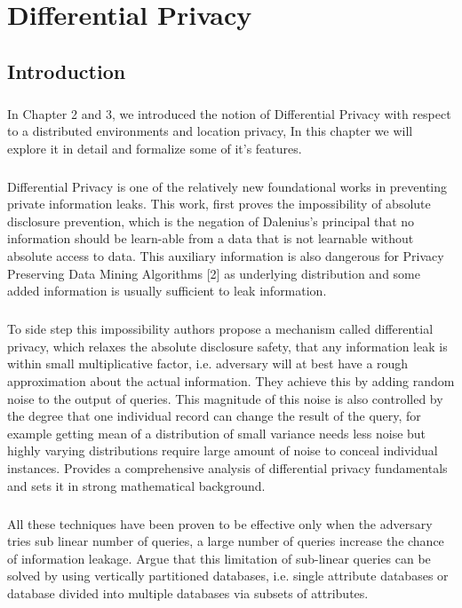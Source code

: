 \documentclass{report}
\begin{document}
\chapter{Differential Privacy}
\section{Introduction}
\paragraph{}
In Chapter 2 and 3, we introduced the notion of Differential Privacy with respect to a distributed environments and location privacy, In this chapter we will explore it in detail and formalize some of it's features. 

\paragraph{}
Differential Privacy \cite{Dwork:2006:DP:2097282.2097284} is one of the relatively new foundational works in preventing private information leaks. This work, first proves the impossibility of absolute disclosure prevention, which is the negation of Dalenius’s principal that no information should be learn-able from a data that is not learnable without absolute access to data. This auxiliary information is also dangerous for Privacy Preserving Data Mining Algorithms [2] as underlying distribution and some added information is usually sufficient to leak information.
\paragraph{}
To side step this impossibility authors propose a mechanism called differential privacy, which relaxes the absolute disclosure safety, that any information leak is within small multiplicative factor, i.e. adversary will at best have a rough approximation about the actual information. They achieve this by adding random noise to the output of queries. This magnitude of this noise is also controlled by the degree that one individual record can change the result of the query, for example getting mean of a distribution of small variance needs less noise but highly varying distributions require large amount of noise to conceal individual instances. \cite{dwork2014algorithmic} Provides a comprehensive analysis of differential privacy fundamentals and sets it in strong mathematical background. 
\paragraph{}
All these techniques have been proven to be effective only when the adversary tries sub linear number of queries, a large number of queries increase the chance of information leakage\cite{haeberlen2011differential}. \cite{dwork2004privacy} Argue that this limitation of sub-linear queries can be solved by using vertically partitioned databases, i.e. single attribute databases or database divided into multiple databases via subsets of attributes.
\end{document}
